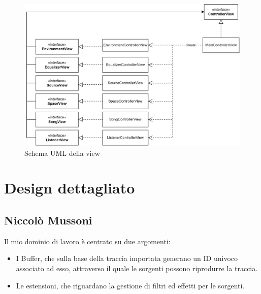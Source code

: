 \documentclass[a4paper,12pt]{report}
\begin{document}
\begin{figure}[H]
\centering{}
\includegraphics[width=\textwidth]{img/architecture/view.png}
\caption{Schema UML della view}
\label{img:analysis}
\end{figure}

\section{Design dettagliato}
\subsection{Niccolò Mussoni}
Il mio dominio di lavoro è centrato su due argomenti:
\begin{itemize}
	\item I Buffer, che sulla base della traccia importata generano un ID univoco associato ad esso, attraverso il quale le sorgenti possono riprodurre la traccia. 
	\item Le estensioni, che riguardano la gestione di filtri ed effetti per le sorgenti.
\end{itemize}
%
\end{document}
